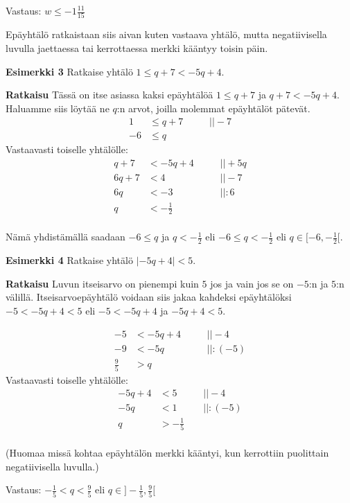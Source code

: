 Vastaus: $w\leq -1\frac{11}{15}$

Epäyhtälö ratkaistaan siis aivan kuten vastaava yhtälö, mutta negatiivisella luvulla
jaettaessa tai kerrottaessa merkki kääntyy toisin päin.

\textbf{Esimerkki 3}
Ratkaise yhtälö $1\leq q+7<-5q+4$.

\textbf{Ratkaisu}
Tässä on itse asiassa kaksi epäyhtälöä $1\leq q+7$ ja $q+7<-5q+4$. Haluamme siis löytää ne $q$:n arvot, joilla molemmat epäyhtälöt pätevät.
\begin{align*}
1&\leq q+7 \ \ \ \ \ &&|| -7 \\
-6&\leq q
\end{align*}
Vastaavasti toiselle yhtälölle:
\begin{align*}
q+7&<-5q+4  \ \ \ \ \ &&|| +5q \\
6q+7&<4 &&|| -7 \\
6q&<-3 &&|| :6 \\
q&< -\frac12 \\
\end{align*}

Nämä yhdistämällä saadaan $-6\leq q$ ja $q< -\frac12$ eli $-6\leq q < -\frac12$ eli $q\in [-6, -\frac12[$.

\textbf{Esimerkki 4}
Ratkaise yhtälö $|-5q+4|<5$.

\textbf{Ratkaisu}
Luvun itseisarvo on pienempi kuin $5$ jos ja vain jos se on $-5$:n ja $5$:n välillä.
Itseisarvoepäyhtälö voidaan siis jakaa kahdeksi epäyhtälöksi $-5<-5q+4<5$ eli $-5<-5q+4$ ja $-5q+4<5$.

\begin{align*}
-5&<-5q+4 \ \ \ \ \ &&|| -4 \\
-9&<-5q &&|| :(-5) \\
\frac95&>q
\end{align*}
Vastaavasti toiselle yhtälölle:
\begin{align*}
-5q+4&<5  \ \ \ \ \ &&|| -4 \\
-5q&<1 &&|| :(-5) \\
q&>-\frac15 \\
\end{align*}

(Huomaa missä kohtaa epäyhtälön merkki kääntyi, kun kerrottiin puolittain negatiivisella luvulla.)

Vastaus: $-\frac15<q<\frac95$ eli $q\in ]-\frac15,\frac95[$

